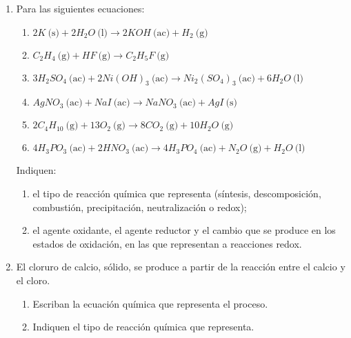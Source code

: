 \documentclass[../Práctica.root.tex]{subfiles}
\newcommand{\lra}{\ensuremath{\longrightarrow{}}}
\newcommand{\eac}{\ \text{(ac)}}
\newcommand{\es}{\ \text{(s)}}
\newcommand{\el}{\ \text{(l)}}
\newcommand{\eg}{\ \text{(g)}}
\begin{document}
\begin{enumerate}
    \item Para las siguientes ecuaciones:
          \begin{enumerate}
              \item $2 K \es + 2 H_2O \el \lra 2 KOH \eac + H_2 \eg$
              \item $C_2H_4 \eg + HF \eg \lra C_2H_5F \eg$
              \item $3 H_2SO_4 \eac + 2 Ni(OH)_3 \eac \lra Ni_2(SO_4)_3 \eac + 6 H_2O \el$
              \item $AgNO_3 \eac + NaI \eac \lra NaNO_3 \eac + AgI \es$
              \item $2 C_4H_{10} \eg + 13 O_2 \eg \lra 8 CO_2 \eg + 10 H_2O \eg$
              \item $4 H_3PO_3 \eac + 2 HNO_3 \eac \lra 4 H_3PO_4 \eac + N_2O \eg + H_2O \el$
          \end{enumerate}
          Indiquen:
          \begin{enumerate}
              \item el tipo de reacción química que representa (síntesis, descomposición, combustión,
                    precipitación, neutralización o redox);
              \item el agente oxidante, el agente reductor y el cambio que se produce en los estados de
                    oxidación, en las que representan a reacciones redox.
          \end{enumerate}

    \item El cloruro de calcio, sólido, se produce a partir de la reacción entre el calcio y el cloro.
          \begin{enumerate}
              \item Escriban la ecuación química que representa el proceso.
              \item Indiquen el tipo de reacción química que representa.
          \end{enumerate}
\end{enumerate}
\end{document}

